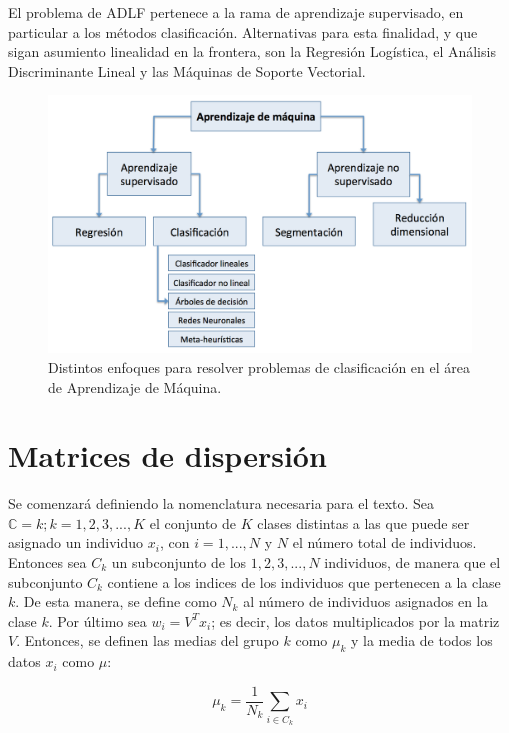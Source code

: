 El problema de ADLF pertenece a la rama de aprendizaje supervisado, en particular a los métodos clasificación. Alternativas para esta finalidad, y que sigan asumiento linealidad en la frontera, son la Regresión Logística, el Análisis Discriminante Lineal y las Máquinas de Soporte Vectorial. 

\begin{figure}[!ht]
  \centering
  \includegraphics[width=1\textwidth]{Figures/Chapter1_Clasificacion1.png} 
  \caption[Enfoques para resolver problemas de clasificación.]
  {Distintos enfoques para resolver problemas de clasificación en el área de Aprendizaje de Máquina.}
\end{figure}

\section{Matrices de dispersión}
Se comenzará definiendo la nomenclatura necesaria para el texto. Sea $\mathbb{C} = {k; k = 1, 2, 3, ..., K}$ el conjunto de $K$ clases distintas a las que puede ser asignado un individuo $x_i$, con $i = 1, ..., N$ y $N$ el número total de individuos. Entonces sea $C_k$ un subconjunto de los ${1, 2, 3, ..., N}$ individuos, de manera que el subconjunto $C_k$ contiene a los indices de los individuos que pertenecen a la clase $k$. De esta manera, se define como $N_{k}$ al número de individuos asignados en la clase $k$. Por último sea $w_i = V^T x_i$; es decir, los datos multiplicados por la matriz $V$. Entonces, se definen las medias del grupo $k$ como $\mu_k$ y la media de todos los datos $x_i$ como $\mu$:

\begin{equation} \label{eq:18}
  \mu_k = \frac{1}{N_{k}} 
  \sum_{i  \in C_k}
                  x_i
\end{equation} 

